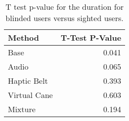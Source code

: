 
\begin{table}[!htb]
\centering
\caption{T test p-value for the duration for blinded users versus sighted users.}
\label{tab:ttest_duration}
\begin{tabular}{lr}
\toprule
      Method &  T-Test P-Value \\
\midrule
        Base &           0.041 \\
       Audio &           0.065 \\
 Haptic Belt &           0.393 \\
Virtual Cane &           0.603 \\
     Mixture &           0.194 \\
\bottomrule
\end{tabular}
\end{table}

